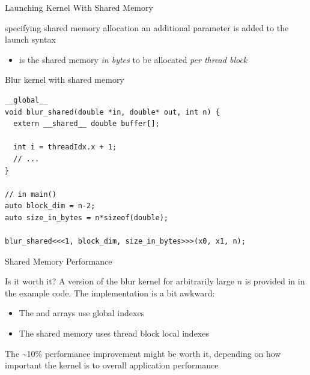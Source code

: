 \begin{frame}[fragile]{Launching Kernel With Shared Memory}
    \begin{info}{specifying shared memory allocation}
        an additional parameter is added to the launch syntax\\
        \centering {}
        \begin{itemize}
            \item {} is the shared memory \emph{in bytes} to be allocated \emph{per thread block}
        \end{itemize}
    \end{info}

    \begin{code}{Blur kernel with shared memory}
        \begin{lstlisting}[style=boxcudatiny]
__global__
void blur_shared(double *in, double* out, int n) {
  extern __shared__ double buffer[];

  int i = threadIdx.x + 1;
  // ...
}

// in main()
auto block_dim = n-2;
auto size_in_bytes = n*sizeof(double);

blur_shared<<<1, block_dim, size_in_bytes>>>(x0, x1, n);
        \end{lstlisting}
    \end{code}

\end{frame}

\begin{frame}[fragile]{Shared Memory Performance}
    \begin{info}{Is it worth it?}
        A version of the blur kernel for arbitrarily large $n$ is provided in  in the example code. The implementation is a bit awkward:
        \begin{itemize}
            \item  The  and  arrays use global indexes
            \item  The shared memory uses thread block local indexes
        \end{itemize}
        The \textasciitilde10\% performance improvement might be worth it, depending on how important the kernel is to overall application performance
    \end{info}

\end{frame}

